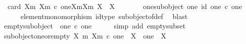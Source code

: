 \begin{isabellebody}
\ \ {\isachardoublequoteopen}card\ {\isacharparenleft}{\kern0pt}{\isacharbraceleft}{\kern0pt}{\isacharparenleft}{\kern0pt}X{\isacharcomma}{\kern0pt}m{\isacharparenright}{\kern0pt}{\isachardot}{\kern0pt}\ {\isacharparenleft}{\kern0pt}X{\isacharcomma}{\kern0pt}m{\isacharparenright}{\kern0pt}\ {\isasymsubseteq}\isactrlsub c\ one{\isacharbraceright}{\kern0pt}{\isacharslash}{\kern0pt}{\isacharslash}{\kern0pt}{\isacharbraceleft}{\kern0pt}{\isacharparenleft}{\kern0pt}{\isacharparenleft}{\kern0pt}X{}{\isacharcomma}{\kern0pt}m{}{\isacharparenright}{\kern0pt}{\isacharcomma}{\kern0pt}{\isacharparenleft}{\kern0pt}X{}{\isacharcomma}{\kern0pt}m{}{\isacharparenright}{\kern0pt}{\isacharparenright}{\kern0pt}{\isachardot}{\kern0pt}\ X{}\ {\isasymcong}\ X{}{\isacharbraceright}{\kern0pt}{\isacharparenright}{\kern0pt}\ {\isacharequal}{\kern0pt}\ {}{\isachardoublequoteclose}\isanewline
%
\isadelimproof
%
\endisadelimproof
%
\isatagproof
{}\isamarkupfalse%
\ {\isacharminus}{\kern0pt}\isanewline
\ \ \isamarkupfalse%
\ one{\isacharunderscore}{\kern0pt}subobject{\isacharcolon}{\kern0pt}\ {\isachardoublequoteopen}{\isacharparenleft}{\kern0pt}one{\isacharcomma}{\kern0pt}\ id\ one{\isacharparenright}{\kern0pt}\ {\isasymsubseteq}\isactrlsub c\ one{\isachardoublequoteclose}\isanewline
\ \ \ \ \isamarkupfalse%
\ element{\isacharunderscore}{\kern0pt}monomorphism\ id{\isacharunderscore}{\kern0pt}type\ subobject{\isacharunderscore}{\kern0pt}of{\isacharunderscore}{\kern0pt}def{}\ \isamarkupfalse%
\ blast\isanewline
\ \ \isamarkupfalse%
\ empty{\isacharunderscore}{\kern0pt}subobject{\isacharcolon}{\kern0pt}\ {\isachardoublequoteopen}{\isacharparenleft}{\kern0pt}{\isasymemptyset}{\isacharcomma}{\kern0pt}\ {\isasymalpha}\isactrlbsub one\isactrlesub {\isacharparenright}{\kern0pt}\ {\isasymsubseteq}\isactrlsub c\ one{\isachardoublequoteclose}\isanewline
\ \ \ \ \isamarkupfalse%
\ {\isacharparenleft}{\kern0pt}simp\ add{\isacharcolon}{\kern0pt}\ empty{\isacharunderscore}{\kern0pt}subset{\isacharparenright}{\kern0pt}\isanewline
\isanewline
\ \ \isamarkupfalse%
\ subobject{\isacharunderscore}{\kern0pt}one{\isacharunderscore}{\kern0pt}or{\isacharunderscore}{\kern0pt}empty{\isacharcolon}{\kern0pt}\ {\isachardoublequoteopen}{\isasymAnd}X\ m{\isachardot}{\kern0pt}\ {\isacharparenleft}{\kern0pt}X{\isacharcomma}{\kern0pt}m{\isacharparenright}{\kern0pt}\ {\isasymsubseteq}\isactrlsub c\ one\ {\isasymLongrightarrow}\ X\ {\isasymcong}\ one\ {\isasymor}\ X\ {\isasymcong}\ {\isasymemptyset}{\isachardoublequoteclose}\isanewline

\end{isabellebody}
